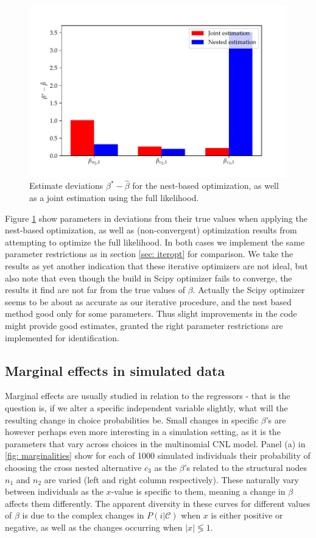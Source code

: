 \begin{figure}[h]
  \centering
  \includegraphics[width=0.8\linewidth]{03_figures/jointEstimation.pdf}
  \caption[Estimate deviations $\beta^* - \hat{\beta}$]{Estimate deviations $\beta^* - \hat{\beta}$ for the nest-based optimization, as well as a joint estimation using the full likelihood.}
  \label{fig: nestandjoint}
\end{figure}

Figure \ref{fig: nestandjoint} show parameters in deviations from their true values when applying the nest-based optimization, as well as (non-convergent) optimization results from attempting to optimize the full likelihood. In both cases we implement the same parameter restrictions as in section \ref{sec: iteropt} for comparison. We take the results as yet another indication that these iterative optimizers are not ideal, but also note that even though the build in Scipy optimizer fails to converge, the results it find are not far from the true values of $\beta$. Actually the Scipy optimizer seems to be about as accurate as our iterative procedure, and the nest based method good only for some parameters. Thus slight improvements in the code might provide good estimates, granted the right parameter restrictions are implemented for identification.

\subsection{Marginal effects in simulated data}
Marginal effects are usually studied in relation to the regressors - that is the question is, if we alter a specific independent variable slightly, what will the resulting change in choice probabilities be. Small changes in specific $\beta$'s are however perhaps even more interesting in a simulation setting, as it is the parameters that vary across choices in the multinomial CNL model. Panel (a) in \ref{fig: marginalities} show for each of 1000 simulated individuals their probability of choosing the cross nested alternative $c_3$ as the $\beta$'s related to the structural nodes $n_1$ and $n_2$ are varied (left and right column respectively). These naturally vary between individuals as the $x$-value is specific to them, meaning a change in $\beta$ affects them differently. The apparent diversity in these curves for different values of $\beta$ is due to the complex changes in $P(i|\mathcal{C})$ when $x$ is either positive or negative, as well as the changes occurring when $|x|\lessgtr 1$.

